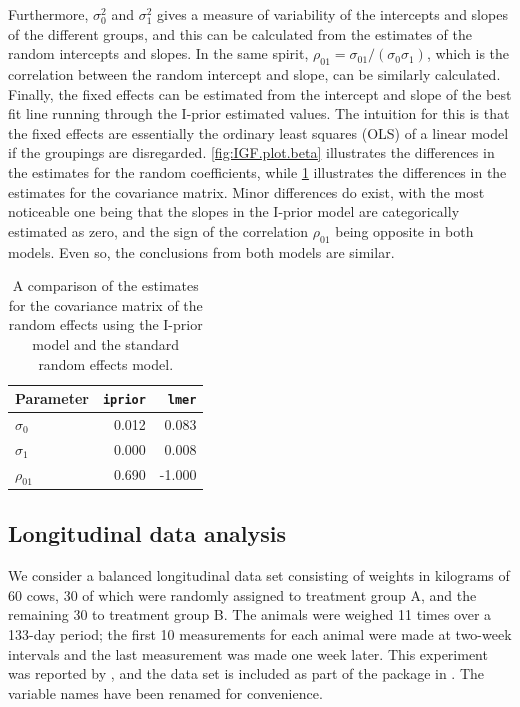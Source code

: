 \documentclass[showframe,11pt]{report}\usepackage[]{graphicx}\usepackage[]{color}
\begin{document}
Furthermore, $\sigma_0^2$ and $\sigma_1^2$ gives a measure of variability of the intercepts and slopes of the different groups, and this can be calculated from the estimates of the random intercepts and slopes.
In the same spirit, $\rho_{01} = \sigma_{01} / (\sigma_0 \sigma_1)$, which is the correlation between the random intercept and slope, can be similarly calculated.
Finally, the fixed effects can be estimated from the intercept and slope of the best fit line running through the I-prior estimated  values.
The intuition for this is that the fixed effects are essentially the ordinary least squares (OLS) of a linear model if the groupings are disregarded.
\cref{fig:IGF.plot.beta} illustrates the differences in the estimates for the random coefficients, while  \cref{tab:igf} illustrates the differences in the estimates for the covariance matrix.
Minor differences do exist, with the most noticeable one being that the slopes in the I-prior model are categorically estimated as zero, and the sign of the correlation $\rho_{01}$ being opposite in both models.
Even so, the conclusions from both models are similar.

\begin{table}[htb]
\centering
\caption{A comparison of the estimates for the covariance matrix of the random effects using the I-prior model and the standard random effects model.}
\label{tab:igf}
\begin{tabular}{lrr}
\toprule
Parameter     & \texttt{iprior} & \texttt{lmer} \\
\midrule
$\sigma_0$    & 0.012 & 0.083 \\
$\sigma_1$    & 0.000 & 0.008 \\
$\rho_{01}$   & 0.690& -1.000 \\
\bottomrule
\end{tabular}
\end{table}


\subsection{Longitudinal data analysis}
\label{sec:cows}

We consider a balanced longitudinal data set consisting of weights in kilograms of 60 cows, 30 of which were randomly assigned to treatment group A, and the remaining 30 to treatment group B.
The animals were weighed 11 times over a 133-day period; the first 10 measurements for each animal were made at two-week intervals and the last measurement was made one week later.
This experiment was reported by \citet{kenward1987method}, and the data set is included as part of the package  \citep{jmcm} in .
The variable names have been renamed for convenience.
\end{document}
